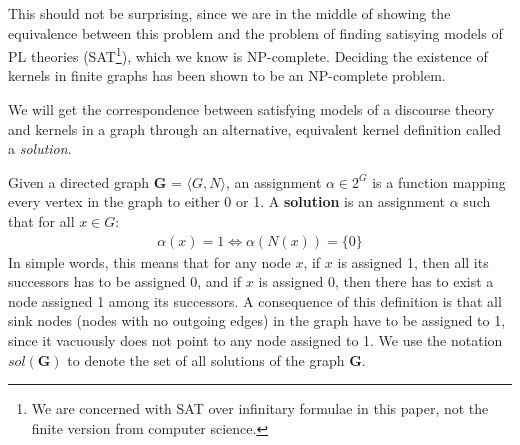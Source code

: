 This should not be surprising, since we are in the middle of showing the equivalence between this problem and the problem of finding satisying models of PL theories (SAT\footnote{We are concerned with SAT over infinitary formulae in this paper, not the finite version from computer science.}), which we know is NP-complete.
Deciding the existence of kernels in finite graphs has been shown to be an NP-complete problem\cite{chvatal}.

We will get the correspondence between satisfying models of a discourse theory and kernels in a graph through an alternative, equivalent kernel definition called a \textit{solution}.

Given a directed graph \textbf{G} = $\langle G,N \rangle$, an assignment $\alpha \in 2^G$ is a function mapping every vertex in the graph to either 0 or 1.
A \textbf{solution} is an assignment $\alpha$ such that for all $x \in G:$
\begin{align}
  \alpha(x) = 1 \iff \alpha(N(x)) = \{ 0 \}
\end{align}
In simple words, this means that for any node $x$, if $x$ is assigned 1, then all its successors has to be assigned  0, and if $x$ is assigned 0, then there has to exist a node assigned 1 among its successors.
A consequence of this definition is that all sink nodes (nodes with no outgoing edges) in the graph have to be assigned to 1, since it vacuously does not point to any node assigned to 1.
We use the notation $sol(\mathbf{G})$ to denote the set of all solutions of the graph \textbf{G}.
